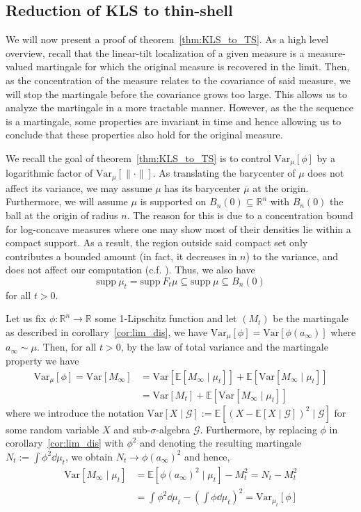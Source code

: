 \subsection{Reduction of KLS to thin-shell}

We will now present a proof of theorem~\ref{thm:KLS_to_TS}.
As a high level overview, recall that the linear-tilt localization of a given measure is a measure-valued martingale
for which the original measure is recovered in the limit. Then, as the concentration of the measure 
relates to the covariance of said measure, we will stop the martingale before the covariance grows too large. 
This allows us to analyze the martingale in a more tractable manner. However, as the the sequence is 
a martingale, some properties are invariant in time and hence allowing us to conclude that these properties 
also hold for the original measure.

We recall the goal of theorem~\ref{thm:KLS_to_TS} is to control \(\text{Var}_\mu[\phi]\) by 
a logarithmic factor of \(\text{Var}_\mu[\|\cdot\|]\). As translating the barycenter of \(\mu\)
does not affect its variance, we may assume \(\mu\) has its barycenter \(\overline{\mu}\) at the origin.
Furthermore, we will assume \(\mu\) is supported on \(B_n(0) \subseteq \mathbb{R}^n\) with 
\(B_n(0)\) the ball at the origin of radius \(n\). The reason for this is due to a concentration 
bound for log-concave measures where one may show most of their densities lie within a compact support.
As a result, the region outside said compact set only contributes a bounded amount (in fact, it decreases 
in \(n\)) to the variance, and does not affect our computation (c.f. \cite{Klartag_2006}). 
Thus, we also have 
\[\text{supp}\ \mu_t = \text{supp}\ F_t\mu \subseteq \text{supp}\ \mu \subseteq B_n(0)\] 
for all \(t > 0\).
 
Let us fix \(\phi : \mathbb{R}^n \to \mathbb{R}\) some 1-Lipschitz function and let \((M_t)\) be the 
martingale as described in corollary~\ref{cor:lim_dis}, we have \(\text{Var}_\mu[\phi] = \text{Var}[\phi(a_\infty)]\) 
where \(a_\infty \sim \mu\).
Then, for all \(t > 0\), by the law of total variance and the martingale property we have
\begin{align*}
  \text{Var}_\mu[\phi] = \text{Var}[M_\infty] & = \text{Var}[\mathbb{E}[M_\infty \mid \mu_t]] + \mathbb{E}[\text{Var}[M_\infty \mid \mu_t]]\\
  & = \text{Var}[M_t] + \mathbb{E}[\text{Var}[M_\infty \mid \mu_t]]
\end{align*}
where we introduce the notation \(\text{Var}[X \mid \mathcal{G}] := \mathbb{E}[(X - \mathbb{E}[X \mid \mathcal{G}])^2 \mid \mathcal{G}]\)
for some random variable \(X\) and sub-\(\sigma\)-algebra \(\mathcal{G}\). Furthermore, by replacing 
\(\phi\) in corollary~\ref{cor:lim_dis} with \(\phi^2\) and denoting the resulting martingale 
\(N_t := \int \phi^2 \dd \mu_t\), we obtain \(N_t \to \phi(a_\infty)^2\) and hence,
\begin{align*}
  \text{Var}[M_\infty \mid \mu_t] & = \mathbb{E}[\phi(a_\infty)^2 \mid \mu_t] - M_t^2 = N_t - M_t^2\\ 
    & = \int \phi^2 \dd \mu_t - \left(\int \phi \dd \mu_t\right)^2 = \text{Var}_{\mu_t}[\phi]
\end{align*}

